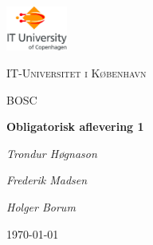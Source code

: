
\begin{titlepage}
	\centering
	\includegraphics[width=0.15\textwidth]{logo}\par\vspace{1cm}
	{\scshape\LARGE IT-Universitet i København \par}
	\vspace{1cm}
	{\scshape\Large BOSC\par}
	\vspace{1.5cm}
	{\huge\bfseries Obligatorisk aflevering 1\par}
	\vspace{2cm}
	{\Large\itshape Trondur Høgnason\par}
	{\Large\itshape Frederik Madsen\par}
	{\Large\itshape Holger Borum\par}
	

	{\large \today\par}
\end{titlepage}